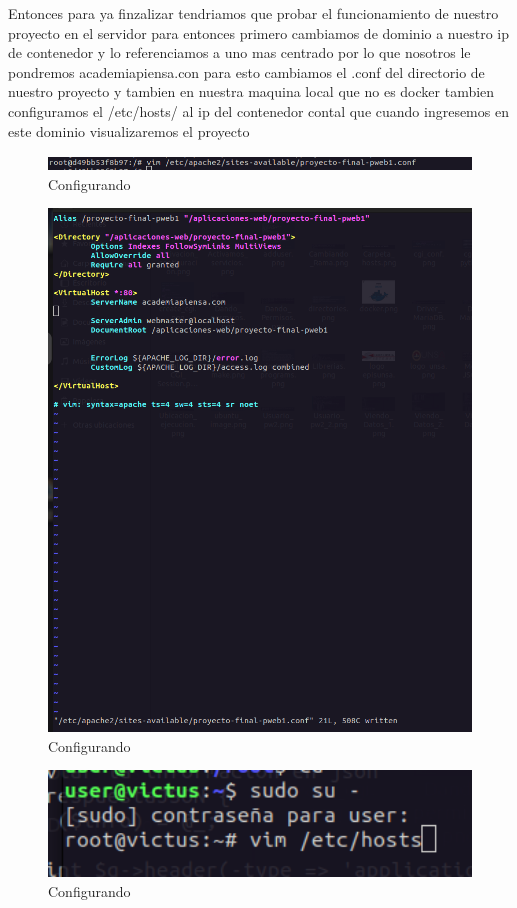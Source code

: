 Entonces para ya finzalizar tendriamos que probar el funcionamiento de nuestro proyecto en el servidor para entonces primero cambiamos de dominio a nuestro ip
de contenedor y lo referenciamos a uno mas centrado por lo que nosotros le pondremos academiapiensa.con para esto cambiamos el .conf del directorio de nuestro
proyecto y tambien en nuestra maquina local que no es docker tambien configuramos el /etc/hosts/ al ip del contenedor contal que cuando ingresemos en este dominio 
visualizaremos el proyecto 
\begin{figure}[H]
  \centering
  \includegraphics[width=1.0\textwidth]{img/Ingresando.png}
  \caption{Configurando}
\end{figure}
\begin{figure}[H]
  \centering
  \includegraphics[width=1.0\textwidth]{img/Configuracion_ServerName.png}
  \caption{Configurando}
\end{figure}
\begin{figure}[H]
  \centering
  \includegraphics[width=1.0\textwidth]{img/Ingresando_Maq_Local.png}
  \caption{Configurando}
\end{figure}
